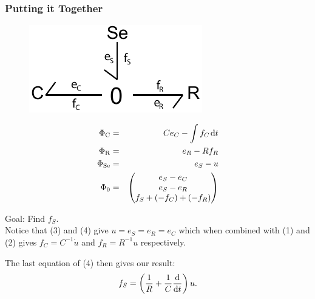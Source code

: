\begin{frame}
\frametitle{Putting it Together}
\begin{small}
\begin{minipage}{0.4\textwidth}
\begin{figure}
	\includegraphics[width=\textwidth]{RC_bondgraph.pdf}
\end{figure}
\end{minipage}
\begin{minipage}{0.57\textwidth}
\begin{eqnarray}
\Phi_\text{C} &=& Ce_C - \int f_C \mspace{2mu} \mathrm{d}t\\
\Phi_\text{R} &=& e_R - Rf_R\\
\Phi_\text{Se} & =& e_S - u\\
\Phi_\text{0} &=&
\left(\begin{matrix}
e_S  - e_C\\
e_S - e_R\\
f_S  + (- f_C) +  (-f_R)
\end{matrix}\right)
\end{eqnarray}
\end{minipage}
Goal: Find $f_S$.\\
Notice that (3) and (4) give $u = e_S =e_R = e_C$ which when combined with (1) and (2) gives $f_C = C^{-1}\dot{u}$ and $f_R = R^{-1}u$ respectively.\\
\vspace{5pt}

The last equation of (4) then gives our result:
\[
f_S = \left(\frac{1}{R} + \frac{1}{C}\frac{\mathrm{d} }{\mathrm{d} t}\right)u.
\]
\end{small}
\end{frame}

